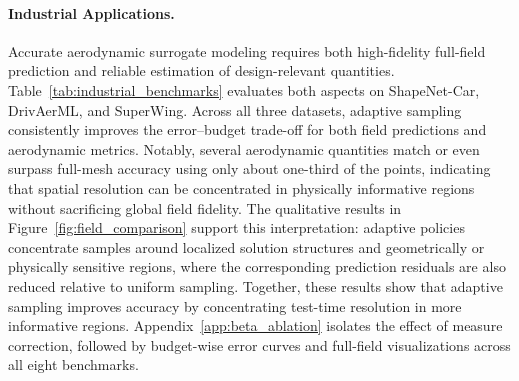 \documentclass{article}
\begin{document}
\paragraph{Industrial Applications.}
Accurate aerodynamic surrogate modeling requires both high-fidelity full-field
prediction and reliable estimation of design-relevant quantities. Table~\ref{tab:industrial_benchmarks} evaluates both aspects on
ShapeNet-Car, DrivAerML, and SuperWing. Across all three datasets, adaptive
sampling consistently improves the error--budget trade-off for both field
predictions and aerodynamic metrics. Notably, several aerodynamic quantities
match or even surpass full-mesh accuracy using only about one-third of the
points, indicating that spatial resolution can be concentrated in physically
informative regions without sacrificing global field fidelity. The qualitative
results in Figure~\ref{fig:field_comparison} support this interpretation:
adaptive policies concentrate samples around localized solution structures and
geometrically or physically sensitive regions, where the corresponding
prediction residuals are also reduced relative to uniform sampling. Together, these results show that adaptive sampling improves accuracy by concentrating test-time resolution in more informative regions. Appendix~\ref{app:beta_ablation} isolates the effect of measure correction,
followed by budget-wise error curves and full-field visualizations across all eight benchmarks.
\end{document}
